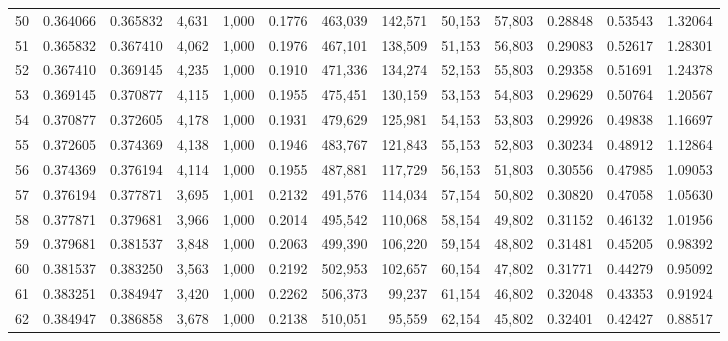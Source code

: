 \begin{tabular}{rrrrrrrrrrrrr}
50  &  0.364066 &  0.365832 &   4,631 &  1,000 &                                     0.1776 &  463,039 &  142,571 &   50,153 &   57,803 &  0.28848 &  0.53543 &  1.32064 \\
51  &  0.365832 &  0.367410 &   4,062 &  1,000 &                                     0.1976 &  467,101 &  138,509 &   51,153 &   56,803 &  0.29083 &  0.52617 &  1.28301 \\
52  &  0.367410 &  0.369145 &   4,235 &  1,000 &                                     0.1910 &  471,336 &  134,274 &   52,153 &   55,803 &  0.29358 &  0.51691 &  1.24378 \\
53  &  0.369145 &  0.370877 &   4,115 &  1,000 &                                     0.1955 &  475,451 &  130,159 &   53,153 &   54,803 &  0.29629 &  0.50764 &  1.20567 \\
54  &  0.370877 &  0.372605 &   4,178 &  1,000 &                                     0.1931 &  479,629 &  125,981 &   54,153 &   53,803 &  0.29926 &  0.49838 &  1.16697 \\
55  &  0.372605 &  0.374369 &   4,138 &  1,000 &                                     0.1946 &  483,767 &  121,843 &   55,153 &   52,803 &  0.30234 &  0.48912 &  1.12864 \\
56  &  0.374369 &  0.376194 &   4,114 &  1,000 &                                     0.1955 &  487,881 &  117,729 &   56,153 &   51,803 &  0.30556 &  0.47985 &  1.09053 \\
57  &  0.376194 &  0.377871 &   3,695 &  1,001 &                                     0.2132 &  491,576 &  114,034 &   57,154 &   50,802 &  0.30820 &  0.47058 &  1.05630 \\
58  &  0.377871 &  0.379681 &   3,966 &  1,000 &                                     0.2014 &  495,542 &  110,068 &   58,154 &   49,802 &  0.31152 &  0.46132 &  1.01956 \\
59  &  0.379681 &  0.381537 &   3,848 &  1,000 &                                     0.2063 &  499,390 &  106,220 &   59,154 &   48,802 &  0.31481 &  0.45205 &  0.98392 \\
60  &  0.381537 &  0.383250 &   3,563 &  1,000 &                                     0.2192 &  502,953 &  102,657 &   60,154 &   47,802 &  0.31771 &  0.44279 &  0.95092 \\
61  &  0.383251 &  0.384947 &   3,420 &  1,000 &                                     0.2262 &  506,373 &   99,237 &   61,154 &   46,802 &  0.32048 &  0.43353 &  0.91924 \\
62  &  0.384947 &  0.386858 &   3,678 &  1,000 &                                     0.2138 &  510,051 &   95,559 &   62,154 &   45,802 &  0.32401 &  0.42427 &  0.88517 \\

\end{tabular}
